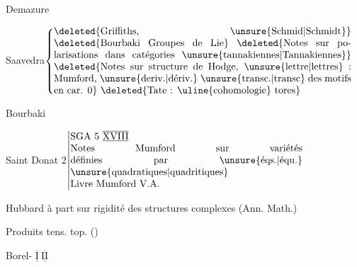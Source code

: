 


Demazure\qquad {}

Saavedra\quad \(\left\{\vcenter{\hbox{\begin{minipage}{.87\linewidth}

\deleted{Griffiths, \unsure{Schmid|Schmidt}}

\deleted{Bourbaki Groupes de Lie}

\deleted{Notes sur polarisations dans catégories \unsure{tannakiennes|Tannakiennes}}

\deleted{Notes sur structure de Hodge, \unsure{lettre|lettres} : Mumford, \unsure{deriv.|dériv.} \unsure{transc.|transc} des motifs en car. 0}

\deleted{Tate : \uline{cohomologie} tores}

\end{minipage}}}\right.\)

\qquad Bourbaki 





Saint Donat 2\qquad \(\left\vert\begin{array}{@{}p{.68\linewidth}@{}}SGA 5 $\overline{\underline{\mathrm{XVIII}}}$\\Notes Mumford sur variétés définies par \unsure{éqs.|équ.} \unsure{quadratiques|quadritiques}\\Livre Mumford V.A.\end{array}\right.\)

Hubbard\qquad {} à part sur rigidité des structures complexes (Ann. Math.)

\qquad Produits tens. top. ()


\clearpage
{}
\uline{}\qquad Borel- $\overline{\underline{\mathrm I}}\ \overline{\underline{\mathrm {II}}}$

